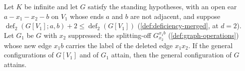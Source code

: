 \begin{theorem}
  \label{thm:pencil-x0-open-ear-two-orbit}
  \leanok
  Let $K$ be infinite and let $G$ satisfy the standing hypotheses, with
  an open ear $a - x_1 - x_2 - b$ on $V_1$ whose ends $a$ and $b$ are not
  adjacent, and suppose $\operatorname{def}_2(G[V_1]; a, b) + 2 \le
  \operatorname{def}_2(G[V_1])$ (\cref{def:deficiency-merged}, at
  $d = 2$). Let $G_1$ be $G$ with $x_2$ suppressed: the splitting-off
  $G_{x_2}^{x_1 b}$ (\cref{def:graph-operations}) whose new edge $x_1 b$
  carries the label of the deleted edge $x_1 x_2$. If the general
  configurations of $G[V_1]$ and of $G_1$ attain, then the general
  configuration of $G$ attains.
\end{theorem}
